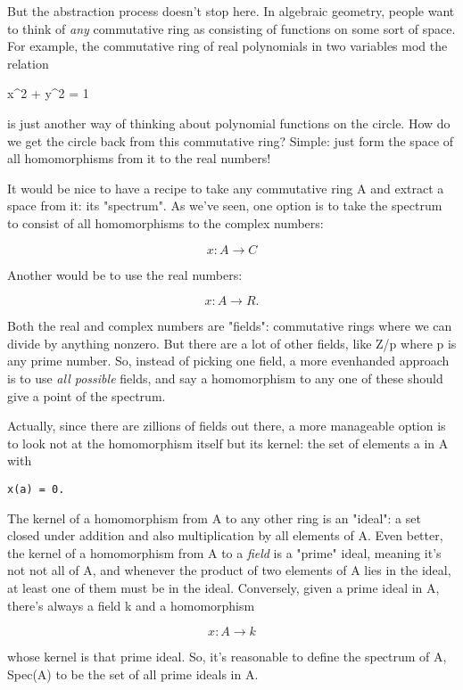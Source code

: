 But the abstraction process doesn't stop here.  In algebraic geometry, 
people want to think of \emph{any} commutative ring as consisting of functions 
on some sort of space.  For example, the commutative ring of real 
polynomials in two variables mod the relation

x^{2} + y^{2} = 1

is just another way of thinking about polynomial functions on the circle.
How do we get the circle back from this commutative ring?  Simple: just 
form the space of all homomorphisms from it to the real numbers! 

It would be nice to have a recipe to take any commutative ring A and
extract a space from it: its "spectrum".  As we've seen, one option is
to take the spectrum to consist of all homomorphisms to the complex
numbers:

$$
x: A \to  C
$$
    

Another would be to use the real numbers:

$$
x: A \to  R.
$$
    

Both the real and complex numbers are "fields": commutative rings
where we can divide by anything nonzero.  But there are a lot of other
fields, like Z/p where p is any prime number.  So, instead of picking
one field, a more evenhanded approach is to use \emph{all possible} fields,
and say a homomorphism to any one of these should give a point of the
spectrum.

Actually, since there are zillions of fields out there, a more
manageable option is to look not at the homomorphism itself but its
kernel: the set of elements a in A with

\begin{verbatim}
x(a) = 0.
\end{verbatim}
    

The kernel of a homomorphism from A to any other ring is an "ideal": a
set closed under addition and also multiplication by all elements of
A.  Even better, the kernel of a homomorphism from A to a \emph{field} is a
"prime" ideal, meaning it's not not all of A, and whenever the product
of two elements of A lies in the ideal, at least one of them must be
in the ideal.  Conversely, given a prime ideal in A, there's always a
field k and a homomorphism

$$
x: A \to  k 
$$
    
whose kernel is that prime ideal.  So, it's reasonable to define 
the spectrum of A, Spec(A) to be the set of all prime ideals in A.  

